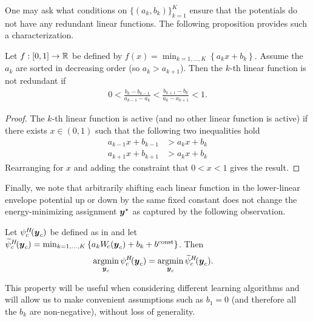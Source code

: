 \documentclass[10pt,journal,letterpaper,compsoc]{IEEEtran}
\begin{document}
One may ask what conditions on $\{(a_k, b_k)\}_{k=1}^K$ ensure that
the potentials do not have any redundant linear functions. The
following proposition provides such a characterization.

\begin{proposition}
  \label{prop:condition}
  Let $f : [0,1] \rightarrow \mathbb{R}$ be defined by $f(x) =
  \min_{k=1,\ldots,K} \left\{a_k x + b_k\right\}$. Assume the $a_k$
  are sorted in decreasing order (so $a_k > a_{k+1}$). Then the $k$-th
  linear function is not redundant if
  \begin{align}
    0
    <
    \frac{b_k - b_{k-1}}{a_{k-1} - a_k}
    <
    \frac{b_{k+1} - b_k}{a_k - a_{k+1}}
    <
    1.
  \end{align}
\end{proposition}

\begin{proof}
  The $k$-th linear function is active (and no other linear function
  is active) if there exists $x \in (0, 1)$ such that the following
  two inequalities hold
  \begin{align*}
    a_{k-1} x + b_{k-1} &> a_k x + b_k \\
    a_{k+1} x + b_{k+1} &> a_k x + b_k
  \end{align*}
  Rearranging for $x$ and adding the constraint that $0 < x < 1$ gives
  the result.
\end{proof}
\bigskip

Finally, we note that arbitrarily shifting each linear function in the
lower-linear envelope potential up or down by the same fixed constant
does not change the energy-minimizing assignment ${\boldsymbol{y}}^\star$ as
captured by the following observation.

\begin{observation}
\label{obs:b0}
Let $\psi^H_c\!({\boldsymbol{y}}_c)$ be defined as in  and
let $\widetilde{\psi}^{H}_c\!({\boldsymbol{y}}_c) = \min_{k=1, \ldots, K}
\left\{a_k W_{\!c}({\boldsymbol{y}}_c) + b_k + b^\textrm{const} \right\}$. Then
%
\begin{align}
  \mathop{\textrm{argmin}}_{{\boldsymbol{y}}_c} \psi^H_c\!({\boldsymbol{y}}_c)
  &= \mathop{\textrm{argmin}}_{{\boldsymbol{y}}_c} \widetilde{\psi}^{H}_c\!({\boldsymbol{y}}_c).
\end{align}
%
\end{observation}

This property will be useful when considering different learning
algorithms and will allow us to make convenient assumptions such as
$b_1 = 0$ (and therefore all the $b_k$ are non-negative), without loss
of generality.
\end{document}
